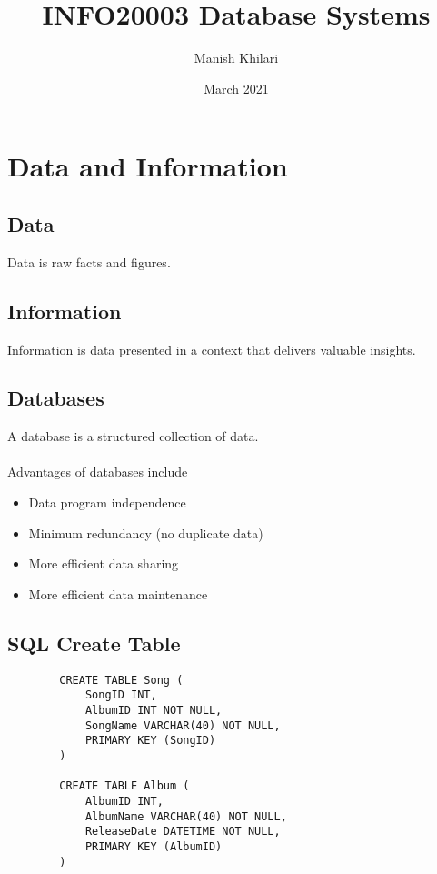 \documentclass[12pt, a4paper]{article}
\title{INFO20003 Database Systems}
\author{Manish Khilari}
\date{March 2021}
\begin{document}
    
    \maketitle

    \section{Data and Information}
    \subsection{Data}
    Data is raw facts and figures. 

    \subsection{Information}
    Information is data presented in a context that delivers valuable insights. 

    \subsection{Databases}
    A database is a structured collection of data. \\\\
    Advantages of databases include 
    \begin{itemize}
        \item Data program independence 
        \item Minimum redundancy (no duplicate data) 
        \item More efficient data sharing 
        \item More efficient data maintenance 
    \end{itemize}

    \subsection{SQL Create Table}
    \begin{verbatim}
        CREATE TABLE Song (
            SongID INT, 
            AlbumID INT NOT NULL, 
            SongName VARCHAR(40) NOT NULL, 
            PRIMARY KEY (SongID)
        )

        CREATE TABLE Album (
            AlbumID INT, 
            AlbumName VARCHAR(40) NOT NULL, 
            ReleaseDate DATETIME NOT NULL, 
            PRIMARY KEY (AlbumID)
        )
    \end{verbatim}
\end{document}
